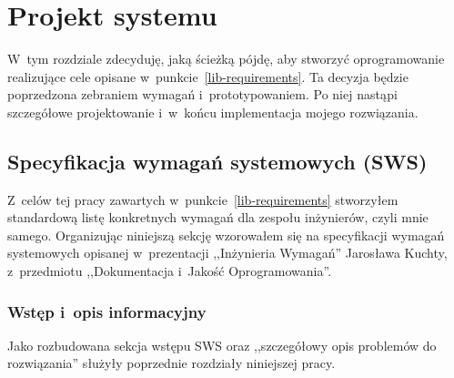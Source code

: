 \chapter{Projekt systemu}
W~tym rozdziale zdecyduję, jaką ścieżką pójdę, aby stworzyć oprogramowanie realizujące cele opisane w~punkcie~\ref{lib-requirements}.
Ta decyzja będzie poprzedzona zebraniem wymagań i~prototypowaniem.
Po niej nastąpi szczegółowe projektowanie i~w~końcu implementacja mojego rozwiązania.



\section{Specyfikacja wymagań systemowych (SWS)}
Z~celów tej pracy zawartych w~punkcie~\ref{lib-requirements} stworzyłem standardową listę konkretnych wymagań dla zespołu inżynierów, czyli mnie samego.
Organizując niniejszą sekcję wzorowałem się na specyfikacji wymagań systemowych opisanej w~prezentacji ,,Inżynieria Wymagań'' Jarosława Kuchty, z~przedmiotu ,,Dokumentacja i~Jakość Oprogramowania''\cite{kuchta}.


\subsection{Wstęp i~opis informacyjny}
Jako rozbudowana sekcja wstępu SWS oraz ,,szczegółowy opis problemów do rozwiązania'' służyły poprzednie rozdziały niniejszej pracy.


